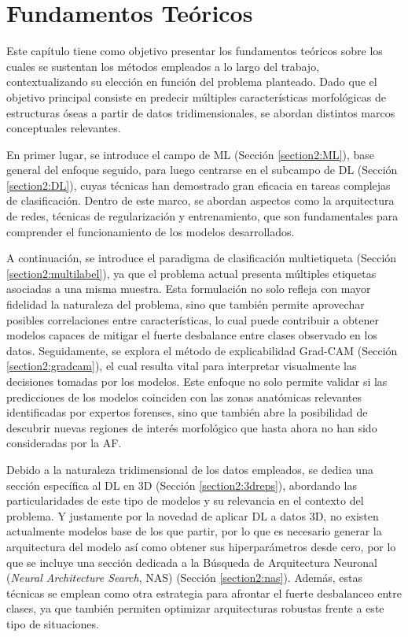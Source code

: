 \chapter{Fundamentos Teóricos}
Este capítulo tiene como objetivo presentar los fundamentos teóricos sobre los cuales se sustentan los métodos empleados a lo largo del trabajo, contextualizando su elección en función del problema planteado. Dado que el objetivo principal consiste en predecir múltiples características morfológicas de estructuras óseas a partir de datos tridimensionales, se abordan distintos marcos conceptuales relevantes.

En primer lugar, se introduce el campo de ML (Sección \ref{section2:ML}), base general del enfoque seguido, para luego centrarse en el subcampo de DL (Sección \ref{section2:DL}), cuyas técnicas han demostrado gran eficacia en tareas complejas de clasificación. Dentro de este marco, se abordan aspectos como la arquitectura de redes, técnicas de regularización y entrenamiento, que son fundamentales para comprender el funcionamiento de los modelos desarrollados.

A continuación, se introduce el paradigma de clasificación multietiqueta (Sección \ref{section2:multilabel}), ya que el problema actual presenta múltiples etiquetas asociadas a una misma muestra. Esta formulación no solo refleja con mayor fidelidad la naturaleza del problema, sino que también permite aprovechar posibles correlaciones entre características, lo cual puede contribuir a obtener modelos capaces de mitigar el fuerte desbalance entre clases observado en los datos. Seguidamente, se explora el método de explicabilidad Grad-CAM (Sección \ref{section2:gradcam}), el cual resulta vital para interpretar visualmente las decisiones tomadas por los modelos. Este enfoque no solo permite validar si las predicciones de los modelos coinciden con las zonas anatómicas relevantes identificadas por expertos forenses, sino que también abre la posibilidad de descubrir nuevas regiones de interés morfológico que hasta ahora no han sido consideradas por la AF.

Debido a la naturaleza tridimensional de los datos empleados, se dedica una sección específica al DL en 3D (Sección \ref{section2:3dreps}), abordando las particularidades de este tipo de modelos y su relevancia en el contexto del problema. Y justamente por la novedad de aplicar DL a datos 3D, no existen actualmente modelos base de los que partir, por lo que es necesario generar la arquitectura del modelo así como obtener sus hiperparámetros desde cero, por lo que se incluye una sección dedicada a la Búsqueda de Arquitectura Neuronal (\textit{Neural Architecture Search}, NAS) (Sección \ref{section2:nas}). Además, estas técnicas se emplean como otra estrategia para afrontar el fuerte desbalanceo entre clases, ya que también permiten optimizar arquitecturas robustas frente a este tipo de situaciones.

